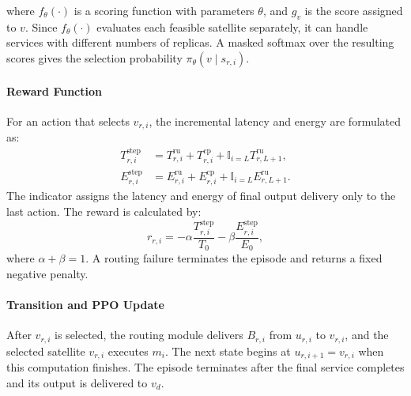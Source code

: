 \documentclass[10pt, conference, letterpaper]{IEEEtran}
\begin{document}
where $f_\theta(\cdot)$ is a scoring function with parameters $\theta$, and $g_v$ is the score assigned to $v$. Since $f_\theta(\cdot)$ evaluates each feasible satellite separately, it can handle services with different numbers of replicas. 
A masked softmax over the resulting scores gives the selection probability $\pi_\theta(v\mid s_{r,i})$.

\paragraph{Reward Function}
For an action that selects $v_{r,i}$, the incremental latency and energy are formulated as:
\begin{align}
T_{r,i}^{\text{step}}&=T_{r,i}^{\text{ru}}+T_{r,i}^{\text{cp}}
+\mathbb I_{i=L}T_{r,L+1}^{\text{ru}},\nonumber\\
E_{r,i}^{\text{step}}&=E_{r,i}^{\text{ru}}+E_{r,i}^{\text{cp}}
+\mathbb I_{i=L}E_{r,L+1}^{\text{ru}}.
\label{eq:new_ppo_step_cost}
\end{align}
The indicator assigns the latency and energy of final output delivery only to the last action.
The reward is calculated by:
\begin{equation}
r_{r,i}=-\alpha\frac{T_{r,i}^{\text{step}}}{T_0}
-\beta\frac{E_{r,i}^{\text{step}}}{E_0},
\label{eq:new_ppo_reward}
\end{equation}
where $\alpha + \beta =1$.
A routing failure terminates the episode and returns a fixed negative penalty. 

\paragraph{Transition and PPO Update}
After $v_{r,i}$ is selected, the routing module delivers $B_{r,i}$ from $u_{r,i}$ to $v_{r,i}$, and the selected satellite $v_{r,i}$ executes $m_i$. The next state begins at $u_{r,i+1}=v_{r,i}$ when this computation finishes. The episode terminates after the final service completes and its output is delivered to $v_d$.
\end{document}
